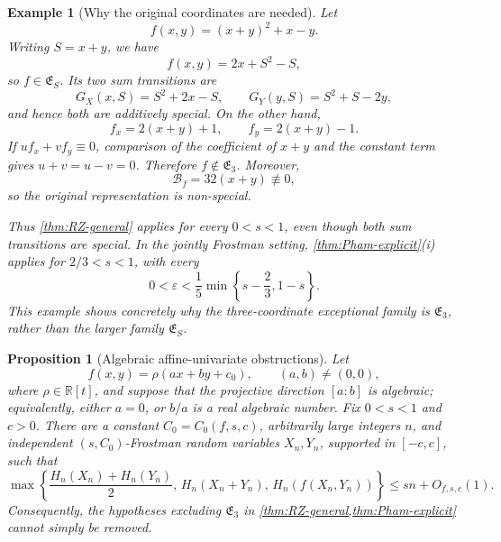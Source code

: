 \documentclass[11pt]{article}
\newtheorem{proposition}[theorem]{Proposition}
\newtheorem{example}[theorem]{Example}
\begin{document}
\begin{example}[Why the original coordinates are needed]
\label{ex:original-coordinates-needed}
Let
\[
 f(x,y)=(x+y)^2+x-y.
\]
Writing \(S=x+y\), we have
\[
 f(x,y)=2x+S^2-S,
\]
so \(f\in\mathfrak E_S\).  Its two sum transitions are
\[
 G_X(x,S)=S^2+2x-S,
 \qquad
 G_Y(y,S)=S^2+S-2y,
\]
and hence both are additively special.  On the other hand,
\[
 f_x=2(x+y)+1,\qquad f_y=2(x+y)-1.
\]
If \(u f_x+v f_y\equiv0\), comparison of the coefficient of
\(x+y\) and the constant term gives \(u+v=u-v=0\).  Therefore
\(f\notin\mathfrak E_3\).  Moreover,
\begin{equation}
 \mathcal B_f=32(x+y)\not\equiv0,
 \label{eq:original-coordinate-curvature-example}
\end{equation}
so the original representation is non-special.

Thus \cref{thm:RZ-general} applies for every \(0<s<1\), even though
both sum transitions are special.  In the jointly Frostman setting,
\cref{thm:Pham-explicit}\textup{(i)} applies for \(2/3<s<1\), with
every
\[
 0<\varepsilon<\frac{1}{5}\min\left\{s-\frac{2}{3},1-s\right\}.
\]
This example shows concretely why the three-coordinate exceptional
family is \(\mathfrak E_3\), rather than the larger family
\(\mathfrak E_S\).
\end{example}

\begin{proposition}[Algebraic affine-univariate obstructions]
\label{prop:algebraic-affine-obstructions}
Let
\[
 f(x,y)=\rho(ax+by+c_0),
 \qquad (a,b)\ne(0,0),
\]
where \(\rho\in\mathbb R[t]\), and suppose that the projective direction
\([a:b]\) is algebraic; equivalently, either \(a=0\), or
\(b/a\) is a real algebraic number.  Fix \(0<s<1\) and \(c>0\).
There are a constant \(C_0=C_0(f,s,c)\), arbitrarily large integers
\(n\), and independent \((s,C_0)\)-Frostman random variables
\(X_n,Y_n\), supported in \([-c,c]\), such that
\begin{equation}
 \max\left\{
 \frac{H_n(X_n)+H_n(Y_n)}{2},\,
 H_n(X_n+Y_n),\,
 H_n(f(X_n,Y_n))
 \right\}
 \le sn+O_{f,s,c}(1).
 \label{eq:algebraic-affine-obstruction}
\end{equation}
Consequently, the hypotheses excluding \(\mathfrak E_3\) in
\cref{thm:RZ-general,thm:Pham-explicit} cannot simply be removed.
\end{proposition}
\end{document}
